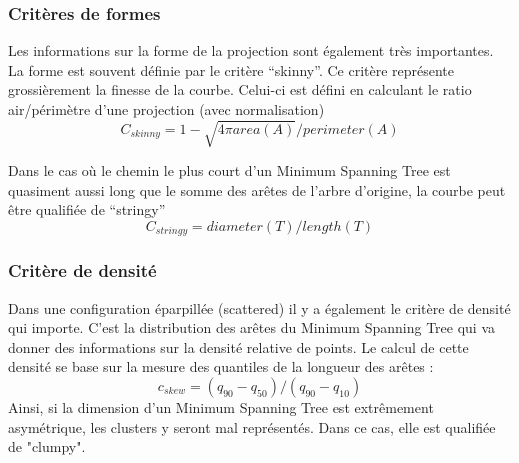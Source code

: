\subsubsection{Critères de formes}

Les informations sur la forme de la projection sont également très importantes.\cite{wilkinson2005graph-MST}
La forme est souvent définie par le critère “skinny”. Ce critère représente grossièrement la
finesse de la courbe. Celui-ci est défini en calculant le ratio air/périmètre d’une projection
(avec normalisation) \[ C_{skinny} = 1 - \sqrt{4\pi area(A)}/perimeter(A) \]

Dans le cas où le chemin le plus court d’un Minimum Spanning Tree est quasiment aussi
long que le somme des arêtes de l’arbre d’origine, la courbe peut être qualifiée de “stringy” \[C_{stringy} = diameter(T)/length(T) \]

\subsubsection{Critère de densité}
Dans une configuration éparpillée (scattered) il y a également le critère de densité qui
importe. C’est la distribution des arêtes du Minimum Spanning Tree qui va donner des
informations sur la densité relative de points.
Le calcul de cette densité se base sur la mesure des quantiles de la longueur des arêtes : 
\[c_{skew} = (q_{90}-q_{50})/(q_{90}-q_{10})\]
Ainsi, si la dimension d’un Minimum Spanning Tree est extrêmement asymétrique, les
clusters y seront mal représentés. Dans ce cas, elle est qualifiée de "clumpy". \cite{wilkinson2005graph-MST}


